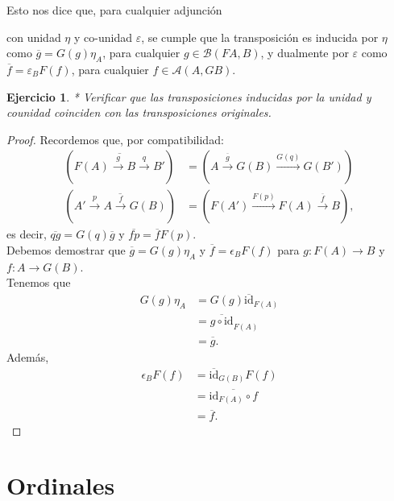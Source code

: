 \documentclass[12pt,letterpaper,titlepage]{article}
\newtheorem{exe}{Ejercicio}
\theoremstyle{definition}
\newcommand\ol[1]{\overline{#1}}
\newcommand{\panth}[1]{\left({#1}\right)}
\newcommand\rar[1]{\xrightarrow{#1}}
\newcommand\<{\langle}
\renewcommand\>{\rangle}
\newcommand{\id}{\mathrm{id}}
\begin{document}
Esto nos dice que, para cualquier adjunción 
\begin{center}
\end{center}
con unidad $\eta$ y co-unidad $\varepsilon$, se cumple que la transposición es inducida por $\eta$ como $\overline{g}=G(g)\eta_A$, para cualquier $g\in\mathcal{B}\panth{FA,B}$, y dualmente por $\varepsilon$ como $\overline{f}=\varepsilon_BF(f)$, para cualquier $f\in\mathcal{A}\panth{A,GB}$.
\begin{exe}%
  * Verificar que las transposiciones inducidas por la
  unidad y counidad coinciden con las transposiciones
  originales.
\end{exe}
\begin{proof}
    Recordemos que, por compatibilidad:
    \begin{align*}
        \left(\ol{F(A)\rar g B \rar q B'}\right)
        &=
        \left(A\rar{\ol g} G(B) \rar{G(q)}G(B')\right) \\
        \left(\ol{A'\rar p A \rar f G(B)}\right)
        &=
        \left(F(A')\rar{F(p)} F(A) \rar{\ol f}B\right),
    \end{align*}
    es decir, $\ol{qg}=G(q)\ol g$ y $\ol{fp}=\ol f F(p)$.\\
    Debemos demostrar que $\overline{g}=G(g)\eta_A$ y $\overline{f}=\epsilon_BF(f)$ para $g\colon F(A)\to B$ y $f\colon A\to G(B)$.\\
Tenemos que
\begin{align*}
G(g)\eta_A&=G(g)\overline{\id}_{F(A)}\\
&=\overline{g\circ \id}_{F(A)}\\
&=\overline{g}.
\end{align*}
Además, 
\begin{align*}
\epsilon_B F(f)&=\overline{\id}_{G(B)}F(f)\\
&=\overline{\id_{F(A)}\circ f}\\
&=\overline{f}.
\end{align*}
\end{proof}


\section{Ordinales}
\end{document}
